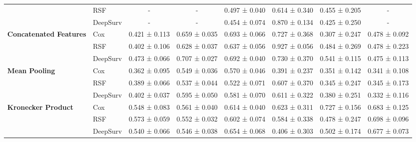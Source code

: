 \begin{sidewaystable}[htbp]
\begin{tabular}{@{}llcccccc@{}}
        & RSF & - & - & 0.497 ± 0.040 & 0.614 ± 0.340 & 0.455 ± 0.205 & - \\
        & DeepSurv & - & - & 0.454 ± 0.074 & 0.870 ± 0.134 & 0.425 ± 0.250 & - \\
        \midrule
        \multirow{3}{*}{\textbf{Concatenated Features}} & Cox & 0.421 ± 0.113 & 0.659 ± 0.035 & 0.693 ± 0.066 & 0.727 ± 0.368 & 0.307 ± 0.247 & 0.478 ± 0.092 \\
        & RSF & 0.402 ± 0.106 & 0.628 ± 0.037 & 0.637 ± 0.056 & 0.927 ± 0.056 & 0.484 ± 0.269 & 0.478 ± 0.223 \\
        & DeepSurv & 0.473 ± 0.066 & 0.707 ± 0.027 & 0.692 ± 0.040 & 0.730 ± 0.370 & 0.541 ± 0.115 & 0.475 ± 0.113 \\
        \midrule
        \multirow{3}{*}{\textbf{Mean Pooling}} & Cox & 0.362 ± 0.095 & 0.549 ± 0.036 & 0.570 ± 0.046 & 0.391 ± 0.237 & 0.351 ± 0.142 & 0.341 ± 0.108 \\
        & RSF & 0.389 ± 0.066 & 0.537 ± 0.044 & 0.522 ± 0.071 & 0.607 ± 0.370 & 0.345 ± 0.247 & 0.345 ± 0.173 \\
        & DeepSurv & 0.402 ± 0.037 & 0.595 ± 0.050 & 0.581 ± 0.070 & 0.611 ± 0.322 & 0.380 ± 0.251 & 0.332 ± 0.116 \\
        \midrule
        \multirow{3}{*}{\textbf{Kronecker Product}} & Cox & 0.548 ± 0.083 & 0.561 ± 0.040 & 0.614 ± 0.040 & 0.623 ± 0.311 & 0.727 ± 0.156 & 0.683 ± 0.125 \\
        & RSF & 0.573 ± 0.059 & 0.552 ± 0.032 & 0.602 ± 0.074 & 0.584 ± 0.338 & 0.478 ± 0.247 & 0.698 ± 0.096 \\
        & DeepSurv & 0.540 ± 0.066 & 0.546 ± 0.038 & 0.654 ± 0.068 & 0.406 ± 0.303 & 0.502 ± 0.174 & 0.677 ± 0.073 \\
        \bottomrule
    \end{tabular}
\end{sidewaystable}